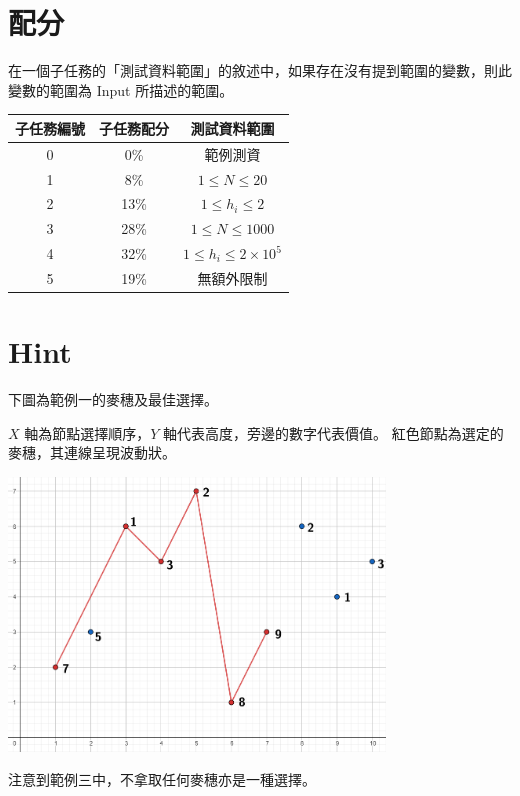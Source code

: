 \documentclass[11pt,a4paper]{article}
\begin{document}
\section*{配分}

在一個子任務的「測試資料範圍」的敘述中，如果存在沒有提到範圍的變數，則此變數的範圍為 Input 所描述的範圍。

\begin{center}
 \begin{tabular}{||c c c||} 
 \hline
 子任務編號 & 子任務配分 & 測試資料範圍 \\  
 \hline\hline
 0 & 0\% & 範例測資 \\ 
 \hline
 1 & 8\% & $1 \le N \le 20$ \\
 \hline
 2 & 13\% & $1 \le h_i \le 2$ \\
 \hline
 3 & 28\% & $1 \le N \le 1000$ \\
 \hline
 4 & 32\% & $1 \le h_i \le 2\times 10^5$ \\
 \hline
 5 & 19\% & 無額外限制 \\
 \hline
\end{tabular}
\end{center}

\section*{Hint}
下圖為範例一的麥穗及最佳選擇。

$X$ 軸為節點選擇順序，$Y$ 軸代表高度，旁邊的數字代表價值。
紅色節點為選定的麥穗，其連線呈現波動狀。
\begin{center}
	\includegraphics[width=10cm]{sample1.png}
\end{center}

注意到範例三中，不拿取任何麥穗亦是一種選擇。
\end{document}
